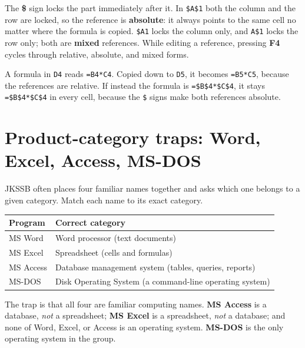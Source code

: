The \textbf{\$} sign locks the part immediately after it. In \texttt{\$A\$1}
both the column and the row are locked, so the reference is
\textbf{absolute}: it always points to the same cell no matter where the
formula is copied. \texttt{\$A1} locks the column only, and \texttt{A\$1}
locks the row only; both are \textbf{mixed} references. While editing a
reference, pressing \textbf{F4} cycles through relative, absolute, and mixed
forms.

\begin{example}
A formula in \texttt{D4} reads \texttt{=B4*C4}. Copied down to \texttt{D5}, it
becomes \texttt{=B5*C5}, because the references are relative. If instead the
formula is \texttt{=\$B\$4*\$C\$4}, it stays \texttt{=\$B\$4*\$C\$4} in
every cell, because the \texttt{\$} signs make both references absolute.
\end{example}

\section{Product-category traps: Word, Excel, Access, MS-DOS}
JKSSB often places four familiar names together and asks which one belongs to
a given category. Match each name to its exact category.

\begin{center}
\begin{tabular}{p{}p{}}
\toprule
\textbf{Program} & \textbf{Correct category} \\
\midrule
MS Word & Word processor (text documents) \\
MS Excel & Spreadsheet (cells and formulas) \\
MS Access & Database management system (tables, queries, reports) \\
MS-DOS & Disk Operating System (a command-line operating system) \\
\bottomrule
\end{tabular}
\end{center}

The trap is that all four are familiar computing names. \textbf{MS Access} is
a database, \emph{not} a spreadsheet; \textbf{MS Excel} is a spreadsheet,
\emph{not} a database; and none of Word, Excel, or Access is an operating
system. \textbf{MS-DOS} is the only operating system in the group.

